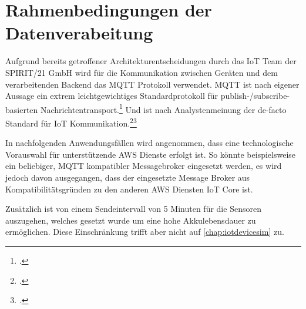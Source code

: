 \section{Rahmenbedingungen der Datenverabeitung}\label{chap:rahmendatenverarbeitung}
Aufgrund bereits getroffener Architekturentscheidungen durch das \ac{IoT} Team der SPIRIT/21 GmbH wird für die Kommunikation zwischen Geräten und dem verarbeitenden Backend das \ac{MQTT} Protokoll verwendet. \ac{MQTT} ist nach eigener Aussage ein extrem leichtgewichtiges Standardprotokoll für publish-/subscribe-basierten Nachrichtentransport.\footcite[Vgl.][]{o.V..2020} Und ist nach Analystenmeinung der de-facto Standard für \ac{IoT} Kommunikation.\footcite[Vgl.][]{Skerrett.25.10.2019}\nzitat \footcite[Vgl.][]{Cabe.17.04.2018} 

In nachfolgenden Anwendungsfällen wird angenommen, dass eine technologische Vorauswahl für unterstützende \ac{AWS} Dienste erfolgt ist.
So könnte beispielsweise ein beliebiger, \ac{MQTT} kompatibler Messagebroker eingesetzt werden, es wird jedoch davon ausgegangen, dass der eingesetzte Message Broker aus Kompatibilitätsgründen zu den anderen \ac{AWS} Diensten \ac{IoT} Core ist.

Zusätzlich ist von einem Sendeintervall von 5 Minuten für die Sensoren auszugehen, welches gesetzt wurde um eine hohe Akkulebensdauer zu ermöglichen. Diese Einschränkung trifft aber nicht auf \autoref{chap:iotdevicesim} zu.

